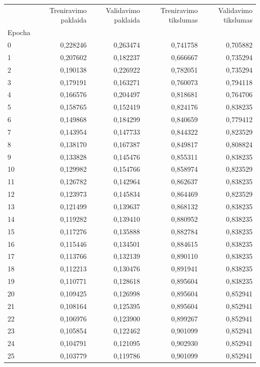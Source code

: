 \begin{tabular}{lrrrr}
\toprule
 & Treniravimo paklaida & Validavimo paklaida & Treniravimo tikslumas & Validavimo tikslumas \\
Epocha &  &  &  &  \\
\midrule
0 & 0,228246 & 0,263474 & 0,741758 & 0,705882 \\
1 & 0,207602 & 0,182237 & 0,666667 & 0,735294 \\
2 & 0,190138 & 0,226922 & 0,782051 & 0,735294 \\
3 & 0,179191 & 0,163271 & 0,760073 & 0,794118 \\
4 & 0,166576 & 0,204497 & 0,818681 & 0,764706 \\
5 & 0,158765 & 0,152419 & 0,824176 & 0,838235 \\
6 & 0,149868 & 0,184299 & 0,840659 & 0,779412 \\
7 & 0,143954 & 0,147733 & 0,844322 & 0,823529 \\
8 & 0,138170 & 0,167387 & 0,849817 & 0,808824 \\
9 & 0,133828 & 0,145476 & 0,855311 & 0,838235 \\
10 & 0,129982 & 0,154766 & 0,858974 & 0,823529 \\
11 & 0,126782 & 0,142964 & 0,862637 & 0,838235 \\
12 & 0,123973 & 0,145834 & 0,864469 & 0,823529 \\
13 & 0,121499 & 0,139637 & 0,868132 & 0,838235 \\
14 & 0,119282 & 0,139410 & 0,880952 & 0,838235 \\
15 & 0,117276 & 0,135888 & 0,882784 & 0,838235 \\
16 & 0,115446 & 0,134501 & 0,884615 & 0,838235 \\
17 & 0,113766 & 0,132139 & 0,890110 & 0,838235 \\
18 & 0,112213 & 0,130476 & 0,891941 & 0,838235 \\
19 & 0,110771 & 0,128618 & 0,895604 & 0,838235 \\
20 & 0,109425 & 0,126998 & 0,895604 & 0,852941 \\
21 & 0,108164 & 0,125395 & 0,895604 & 0,852941 \\
22 & 0,106976 & 0,123900 & 0,899267 & 0,852941 \\
23 & 0,105854 & 0,122462 & 0,901099 & 0,852941 \\
24 & 0,104791 & 0,121095 & 0,902930 & 0,852941 \\
25 & 0,103779 & 0,119786 & 0,901099 & 0,852941 \\

\end{tabular}

